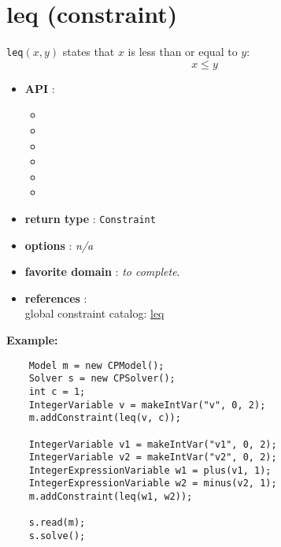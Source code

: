 \label{leq}
\hypertarget{leq}{}

\section{leq (constraint)}\label{leq:leqconstraint}\hypertarget{leq:leqconstraint}{}
\begin{notedef}
  \texttt{leq}$(x,y)$ states that $x$ is less than or equal to $y$:
$$x \le y$$
\end{notedef}

\begin{itemize}
	\item \textbf{API} :
	\begin{itemize}
		\item {}
		\item {}
		\item {}
		\item {}
		\item {}
		\item {}
	\end{itemize}
	\item \textbf{return type} : \texttt{Constraint}
	\item \textbf{options} : \emph{n/a}
	\item \textbf{favorite domain} : \emph{to complete}.
	\item \textbf{references} :\\
      global constraint catalog: \href{http://www.emn.fr/x-info/sdemasse/gccat/Cleq.html}{leq}
\end{itemize}

\textbf{Example:}
\begin{lstlisting}
	Model m = new CPModel();
	Solver s = new CPSolver();
	int c = 1;
	IntegerVariable v = makeIntVar("v", 0, 2);
	m.addConstraint(leq(v, c));

	IntegerVariable v1 = makeIntVar("v1", 0, 2);
	IntegerVariable v2 = makeIntVar("v2", 0, 2);
	IntegerExpressionVariable w1 = plus(v1, 1);
	IntegerExpressionVariable w2 = minus(v2, 1);
	m.addConstraint(leq(w1, w2));

	s.read(m);
	s.solve();
\end{lstlisting}
